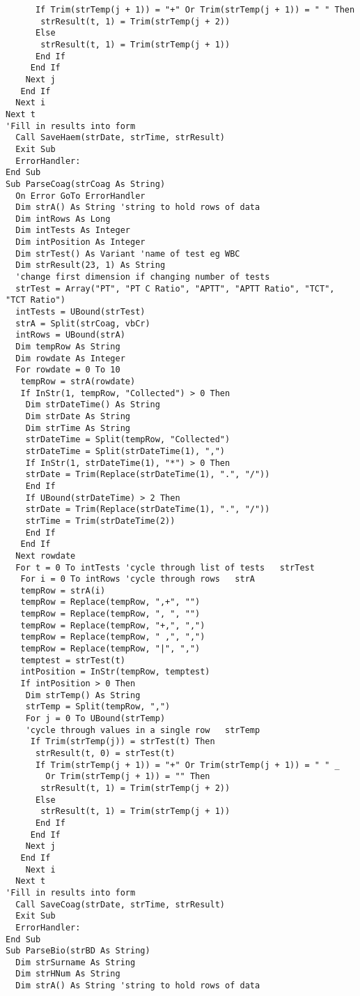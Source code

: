 \begin{lstlisting}
      If Trim(strTemp(j + 1)) = "+" Or Trim(strTemp(j + 1)) = " " Then
       strResult(t, 1) = Trim(strTemp(j + 2))
      Else
       strResult(t, 1) = Trim(strTemp(j + 1))
      End If
     End If
    Next j
   End If
  Next i
Next t
'Fill in results into form
  Call SaveHaem(strDate, strTime, strResult)
  Exit Sub
  ErrorHandler:
End Sub
Sub ParseCoag(strCoag As String)
  On Error GoTo ErrorHandler
  Dim strA() As String 'string to hold rows of data
  Dim intRows As Long
  Dim intTests As Integer
  Dim intPosition As Integer
  Dim strTest() As Variant 'name of test eg WBC
  Dim strResult(23, 1) As String 
  'change first dimension if changing number of tests
  strTest = Array("PT", "PT C Ratio", "APTT", "APTT Ratio", "TCT", "TCT Ratio")
  intTests = UBound(strTest)
  strA = Split(strCoag, vbCr)
  intRows = UBound(strA)
  Dim tempRow As String
  Dim rowdate As Integer
  For rowdate = 0 To 10
   tempRow = strA(rowdate)
   If InStr(1, tempRow, "Collected") > 0 Then
    Dim strDateTime() As String
    Dim strDate As String
    Dim strTime As String
    strDateTime = Split(tempRow, "Collected")
    strDateTime = Split(strDateTime(1), ",")
    If InStr(1, strDateTime(1), "*") > 0 Then
    strDate = Trim(Replace(strDateTime(1), ".", "/"))
    End If
    If UBound(strDateTime) > 2 Then
    strDate = Trim(Replace(strDateTime(1), ".", "/"))
    strTime = Trim(strDateTime(2))
    End If
   End If
  Next rowdate
  For t = 0 To intTests 'cycle through list of tests   strTest
   For i = 0 To intRows 'cycle through rows   strA
   tempRow = strA(i)
   tempRow = Replace(tempRow, ",+", "")
   tempRow = Replace(tempRow, ", ", "")
   tempRow = Replace(tempRow, "+,", ",")
   tempRow = Replace(tempRow, " ,", ",")
   tempRow = Replace(tempRow, "|", ",")
   temptest = strTest(t)
   intPosition = InStr(tempRow, temptest)
   If intPosition > 0 Then
    Dim strTemp() As String
    strTemp = Split(tempRow, ",")
    For j = 0 To UBound(strTemp) 
    'cycle through values in a single row   strTemp
     If Trim(strTemp(j)) = strTest(t) Then
      strResult(t, 0) = strTest(t)
      If Trim(strTemp(j + 1)) = "+" Or Trim(strTemp(j + 1)) = " " _
        Or Trim(strTemp(j + 1)) = "" Then
       strResult(t, 1) = Trim(strTemp(j + 2))
      Else
       strResult(t, 1) = Trim(strTemp(j + 1))
      End If
     End If
    Next j
   End If
    Next i
  Next t
'Fill in results into form
  Call SaveCoag(strDate, strTime, strResult)
  Exit Sub
  ErrorHandler:
End Sub
Sub ParseBio(strBD As String)
  Dim strSurname As String
  Dim strHNum As String
  Dim strA() As String 'string to hold rows of data

\end{lstlisting}
